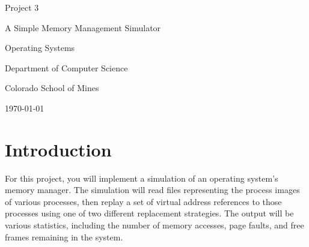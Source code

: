 \documentclass[10pt]{article}
\begin{document}
\thispagestyle{empty}
\begin{titlepage}
    \centering
    {\Huge Project 3 \par \vspace{0.5cm}}
    {\Large A Simple Memory Management Simulator \par}
    {\normalsize   \par}

    \vfill
    {\normalsize Operating Systems \par}
    {\normalsize Department of Computer Science \par}
    {\normalsize Colorado School of Mines \par}
    {\normalsize \today \par}
    \thispagestyle{empty}
    \thispagestyle{empty}
\end{titlepage}

\clearpage
\pagestyle{fancy}

\newcommand{\assigndate}{April 15, 2020}
\newcommand{\duedate}{23:59 May 1, 2020}
\newcommand{\duedatefinal}{23:59 May 6, 2020}
\newcommand{\gittagdone}{P3-DONE}


\section*{Introduction}


\linenumbers
For this project, you will implement a simulation of an operating system’s memory manager. The simulation
will read files representing the process images of various processes, then replay a set of virtual address
references to those processes using one of two different replacement strategies. The output will be various
statistics, including the number of memory accesses, page faults, and free frames remaining in the system.
\end{document}
